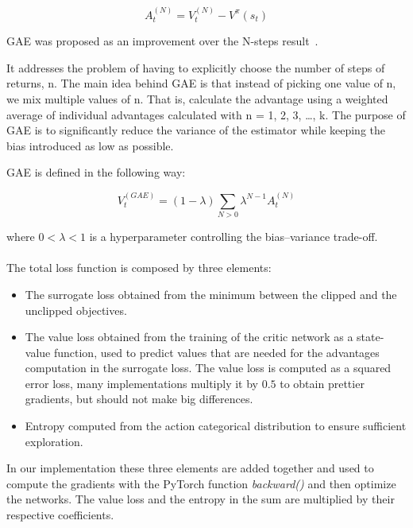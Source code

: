 \documentclass[11pt, a4paper, hidelinks]{report}
\begin{document}
\begin{equation}
	A_t^{(N)} = V_t^{(N)} - V^{\pi}(s_t)\label{eq:N-step-advantage}
\end{equation}

GAE was proposed as an improvement over the N-steps result~\citep{gae}.

\begin{quoting}[font=itshape, begintext={"}, endtext={"\citep{graesser2019foundations}}]
It addresses the problem of having to explicitly choose the number of steps of returns, n.
The main idea behind GAE is that instead of picking one value of n, we mix multiple values of n.
That is, calculate the advantage using a weighted average of individual advantages calculated with n = 1, 2, 3, \dots, k.
The purpose of GAE is to significantly reduce the variance of the estimator while keeping the bias introduced as low as possible.
\end{quoting}

GAE is defined in the following way:

\begin{equation}
	V_t^{(GAE)} = (1 - \lambda)\sum_{N > 0} \lambda^{N - 1}A_t^{(N)}\label{eq:GAE}
\end{equation}

where $0 < \lambda < 1$ is a hyperparameter controlling the bias–variance trade-off.
\\
\\
The total loss function is composed by three elements:
\begin{itemize}
	\item The surrogate loss obtained from the minimum between the clipped and the unclipped objectives.
	\item The value loss obtained from the training of the critic network as a state-value function, used to predict values that are needed for the advantages computation in the surrogate loss.
The value loss is computed as a squared error loss, many implementations multiply it by $0.5$ to obtain prettier gradients, but should not make big differences.
	\item Entropy computed from the action categorical distribution to ensure sufficient exploration.
\end{itemize}

In our implementation these three elements are added together and used to compute the gradients with the PyTorch function \textit{backward()} and then optimize the networks.
The value loss and the entropy in the sum are multiplied by their respective coefficients.
\end{document}
